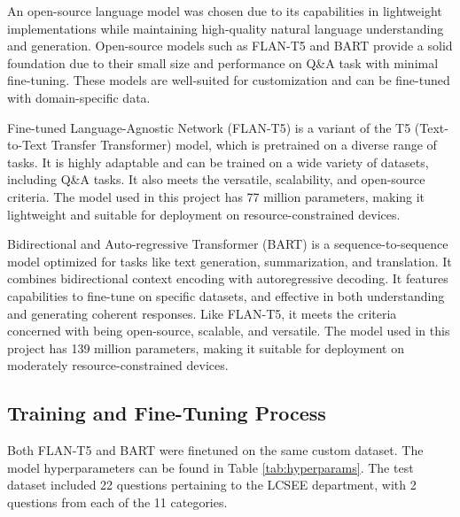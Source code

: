 \documentclass[conference]{IEEEtran}
\begin{document}
An open-source language model was chosen due to its capabilities in lightweight implementations while maintaining high-quality natural language understanding and generation.
Open-source models such as FLAN-T5 \cite{b8} and BART \cite{b9} provide a solid foundation due to their small size and performance on Q\&A task with minimal fine-tuning. 
These models are well-suited for customization and can be fine-tuned with domain-specific data.

Fine-tuned Language-Agnostic Network (FLAN-T5) is a variant of the T5 (Text-to-Text Transfer Transformer) model, which is pretrained on a diverse range of tasks. 
It is highly adaptable and can be trained on a wide variety of datasets, including Q\&A tasks. 
It also meets the versatile, scalability, and open-source criteria. 
The model used in this project has 77 million parameters, making it lightweight and suitable for deployment on resource-constrained devices.

Bidirectional and Auto-regressive Transformer (BART) is a sequence-to-sequence model optimized for tasks like text generation, summarization, and translation. 
It combines bidirectional context encoding with autoregressive decoding. 
It features capabilities to fine-tune on specific datasets, and effective in both understanding and generating coherent responses.
Like FLAN-T5, it meets the criteria concerned with being open-source, scalable, and versatile. 
The model used in this project has 139 million parameters, making it suitable for deployment on moderately resource-constrained devices.

\subsection{Training and Fine-Tuning Process} 
Both FLAN-T5 and BART were finetuned on the same custom dataset. The model hyperparameters can be found in Table \ref{tab:hyperparams}.
The test dataset included 22 questions pertaining to the LCSEE department, with 2 questions from each of the 11 categories. 
\end{document}
